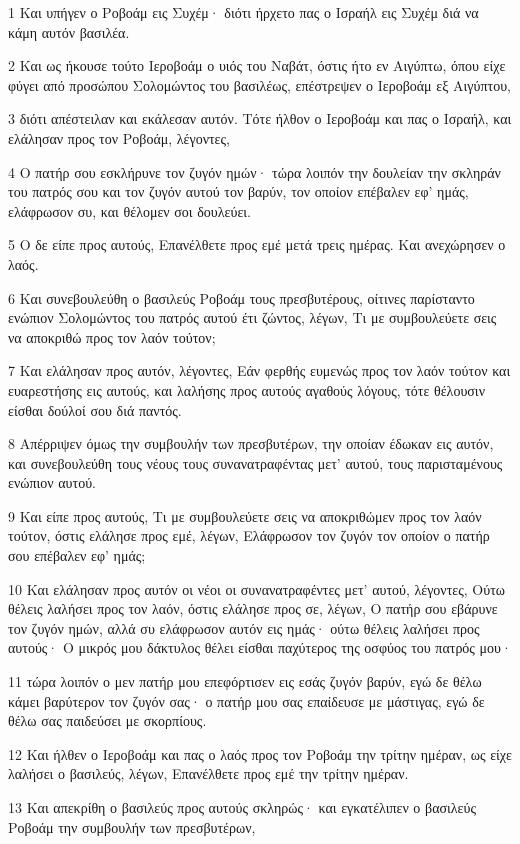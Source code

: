 \par 1 Και υπήγεν ο Ροβοάμ εις Συχέμ· διότι ήρχετο πας ο Ισραήλ εις Συχέμ διά να κάμη αυτόν βασιλέα.
\par 2 Και ως ήκουσε τούτο Ιεροβοάμ ο υιός του Ναβάτ, όστις ήτο εν Αιγύπτω, όπου είχε φύγει από προσώπου Σολομώντος του βασιλέως, επέστρεψεν ο Ιεροβοάμ εξ Αιγύπτου,
\par 3 διότι απέστειλαν και εκάλεσαν αυτόν. Τότε ήλθον ο Ιεροβοάμ και πας ο Ισραήλ, και ελάλησαν προς τον Ροβοάμ, λέγοντες,
\par 4 Ο πατήρ σου εσκλήρυνε τον ζυγόν ημών· τώρα λοιπόν την δουλείαν την σκληράν του πατρός σου και τον ζυγόν αυτού τον βαρύν, τον οποίον επέβαλεν εφ' ημάς, ελάφρωσον συ, και θέλομεν σοι δουλεύει.
\par 5 Ο δε είπε προς αυτούς, Επανέλθετε προς εμέ μετά τρεις ημέρας. Και ανεχώρησεν ο λαός.
\par 6 Και συνεβουλεύθη ο βασιλεύς Ροβοάμ τους πρεσβυτέρους, οίτινες παρίσταντο ενώπιον Σολομώντος του πατρός αυτού έτι ζώντος, λέγων, Τι με συμβουλεύετε σεις να αποκριθώ προς τον λαόν τούτον;
\par 7 Και ελάλησαν προς αυτόν, λέγοντες, Εάν φερθής ευμενώς προς τον λαόν τούτον και ευαρεστήσης εις αυτούς, και λαλήσης προς αυτούς αγαθούς λόγους, τότε θέλουσιν είσθαι δούλοί σου διά παντός.
\par 8 Απέρριψεν όμως την συμβουλήν των πρεσβυτέρων, την οποίαν έδωκαν εις αυτόν, και συνεβουλεύθη τους νέους τους συνανατραφέντας μετ' αυτού, τους παρισταμένους ενώπιον αυτού.
\par 9 Και είπε προς αυτούς, Τι με συμβουλεύετε σεις να αποκριθώμεν προς τον λαόν τούτον, όστις ελάλησε προς εμέ, λέγων, Ελάφρωσον τον ζυγόν τον οποίον ο πατήρ σου επέβαλεν εφ' ημάς;
\par 10 Και ελάλησαν προς αυτόν οι νέοι οι συνανατραφέντες μετ' αυτού, λέγοντες, Ούτω θέλεις λαλήσει προς τον λαόν, όστις ελάλησε προς σε, λέγων, Ο πατήρ σου εβάρυνε τον ζυγόν ημών, αλλά συ ελάφρωσον αυτόν εις ημάς· ούτω θέλεις λαλήσει προς αυτούς· Ο μικρός μου δάκτυλος θέλει είσθαι παχύτερος της οσφύος του πατρός μου·
\par 11 τώρα λοιπόν ο μεν πατήρ μου επεφόρτισεν εις εσάς ζυγόν βαρύν, εγώ δε θέλω κάμει βαρύτερον τον ζυγόν σας· ο πατήρ μου σας επαίδευσε με μάστιγας, εγώ δε θέλω σας παιδεύσει με σκορπίους.
\par 12 Και ήλθεν ο Ιεροβοάμ και πας ο λαός προς τον Ροβοάμ την τρίτην ημέραν, ως είχε λαλήσει ο βασιλεύς, λέγων, Επανέλθετε προς εμέ την τρίτην ημέραν.
\par 13 Και απεκρίθη ο βασιλεύς προς αυτούς σκληρώς· και εγκατέλιπεν ο βασιλεύς Ροβοάμ την συμβουλήν των πρεσβυτέρων,
